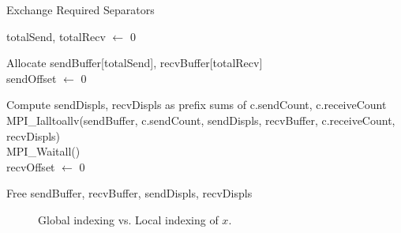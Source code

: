 \begin{algorithm}[H]
    \label{alg:req_sep_exchange}
    \caption{Exchange Required Separators}
    \SetAlgoVlined

    totalSend, totalRecv $\gets$ 0\\

    Allocate sendBuffer[totalSend], recvBuffer[totalRecv]\\

    sendOffset $\gets$ 0\\

    Compute sendDispls, recvDispls as prefix sums of c.sendCount, c.receiveCount\\

    MPI\_Ialltoallv(sendBuffer, c.sendCount, sendDispls, recvBuffer, c.receiveCount, recvDispls)\\

    MPI\_Waitall()\\

    recvOffset $\gets$ 0\\

    Free sendBuffer, recvBuffer, sendDispls, recvDispls\\
\end{algorithm}


\begin{figure}[ht]
    \centering
    \caption{Global indexing vs. Local indexing of \(x\).}
    \label{fig:2dcomm}
\end{figure}








